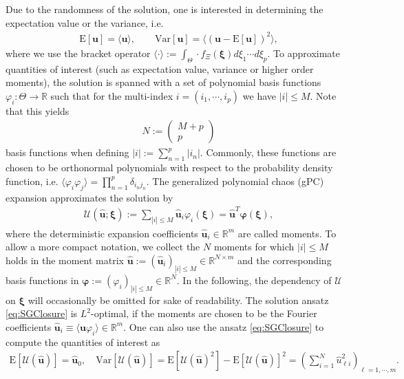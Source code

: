 Due to the randomness of the solution, one is interested in determining the expectation value or the variance, i.e.
\begin{align*}
\text{E}[\bm{u}] = \langle \bm{u} \rangle,\qquad \text{Var}[\bm{u}] = \langle \left( \bm{u}-\text{E}[\bm{u}]\right)^2\rangle,
\end{align*}
where we use the bracket operator $\langle \cdot \rangle := \int_{\Theta} \cdot f_{\Xi}(\bm\xi)d\xi_1 \cdots d\xi_p$. To approximate quantities of interest (such as expectation value, variance or higher order moments), the solution is spanned with a set of polynomial basis functions $\varphi_{i}:\Theta\to\mathbb{R}$ such that for the multi-index $i = (i_1,\cdots,i_p)$ we have $|i| \leq M$. Note that this yields
\begin{align}\label{eq:numberBasisFcts}
N:=\begin{pmatrix}
M+p \\ p
\end{pmatrix}
\end{align}
basis functions when defining $|i|:=\sum_{n = 1}^p |i_n|$. Commonly, these functions are chosen to be orthonormal polynomials \cite{wiener1938homogeneous} with respect to the probability density function, i.e. $\langle \varphi_i \varphi_j \rangle =\prod_{n=1}^p\delta_{i_nj_n}$. The generalized polynomial chaos (gPC) expansion \cite{xiu2002wiener} approximates the solution by
\begin{align}\label{eq:SGClosure}
\mathcal{U}(\bm{\hat u};\bm\xi):= \sum_{|i|\leq M} \bm{\hat{u}}_i\varphi_i(\bm{\xi}) = \bm{\hat{u}}^T\bm{\varphi}(\bm\xi),
\end{align}
where the deterministic expansion coefficients $\bm{\hat{u}}_i\in\mathbb{R}^m$ are called moments. To allow a more compact notation, we collect the $N$ moments for which $\vert i \vert \leq M$ holds in the moment matrix $\bm{\hat{u}}:=(\bm{\hat{u}}_i)_{|i|\leq M}\in\mathbb{R}^{N\times m}$ and the corresponding basis functions in $\bm{\varphi}:=(\varphi_i)_{|i|\leq M}\in\mathbb{R}^{N}$. In the following, the dependency of $\mathcal{U}$ on $\bm \xi$ will occasionally be omitted for sake of readability. The solution ansatz \eqref{eq:SGClosure} is $L^2$-optimal, if the moments are chosen to be the Fourier coefficients $\bm{\hat u}_i \equiv \langle \bm{u}\varphi_i \rangle\in\mathbb{R}^m$. One can also use the ansatz \eqref{eq:SGClosure} to compute the quantities of interest as
\begin{align*}
\text{E}[\mathcal{U}(\bm{\hat u})] = \bm{\hat u}_0,\quad \text{Var}[\mathcal{U}(\bm{\hat u})] = \text{E}[\mathcal{U}(\bm{\hat u})^2] - \text{E}[\mathcal{U}(\bm{\hat u})]^2 = \left(\sum_{i = 1}^N \hat{u}_{\ell i}^2\right)_{\ell = 1,\cdots,m}.
\end{align*}

